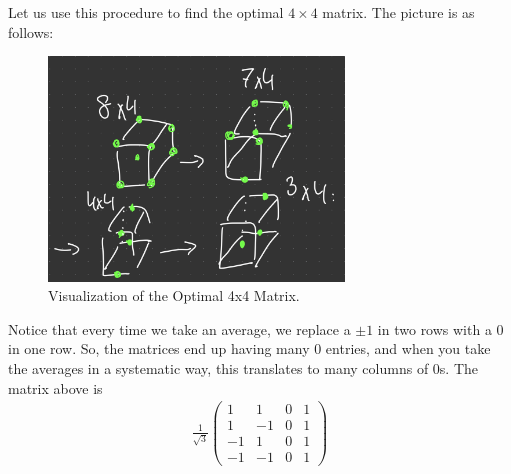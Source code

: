\documentclass[12pt]{article}
\theoremstyle{definitionstyle}
\begin{document}
    Let us use this procedure to find the optimal $4 \times 4$ matrix. The picture is as follows:
    \begin{figure}[H]
        \centering
        \includegraphics[width=0.7\textwidth]{opt4x4.png}
        \caption{Visualization of the Optimal 4x4 Matrix.}
        \label{fig: opt4x4}
    \end{figure}
    Notice that every time we take an average, we replace a $\pm 1$ in two rows with a 0 in one row. So, the matrices end up having many 0 entries, and when you take the averages in a systematic way, this translates to many columns of 0s. The matrix above is
    \begin{align*}
        \frac{1}{\sqrt{3}}\begin{pmatrix}
            1 & 1 & 0 & 1 \\
            1 & -1 & 0 & 1 \\
            -1 & 1 & 0 & 1 \\
            -1 & -1 & 0 & 1
        \end{pmatrix}
    \end{align*}
\end{document}
